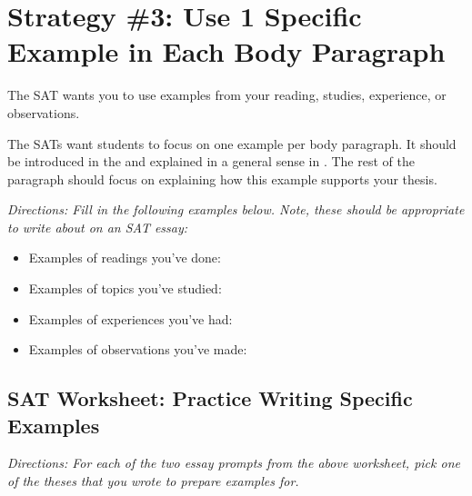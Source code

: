 \section{Strategy \#3: Use 1 Specific Example in Each Body Paragraph}

The SAT wants you to use examples from your reading, studies, experience, or observations.

The SATs want students to focus on one example per body paragraph. It should be introduced in \underline{\hspace{2in}} the and explained in a general sense in \underline{\hspace{2in}}. The rest of the paragraph should focus on explaining how this example supports your thesis.

\textit{Directions: Fill in the following examples below. Note, these should be appropriate to write about on an SAT essay:}

\begin{itemize}
\item Examples of readings you've done: \hrulefill

\hrulefill

\item Examples of topics you've studied: \hrulefill

\hrulefill

\item Examples of experiences you've had: \hrulefill

\hrulefill

\item Examples of observations you've made: \hrulefill

\hrulefill
\end{itemize} 

\subsection{SAT Worksheet: Practice Writing Specific Examples}

\textit{Directions: For each of the two essay prompts from the above worksheet, pick one of the theses
that you wrote to prepare examples for.}

